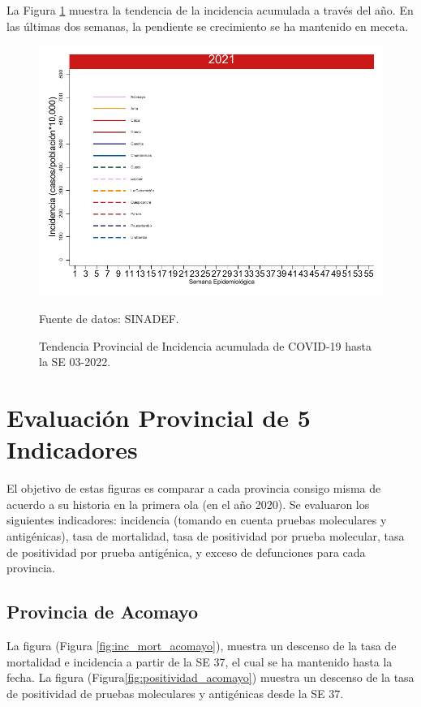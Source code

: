 \documentclass[12pt,a4paper,openany]{book}
\begin{document}
La Figura \ref{fig:incidencia_provincial} muestra la tendencia de la incidencia acumulada a través del año. En las últimas dos semanas, la pendiente se crecimiento se ha mantenido en meceta. 
%
\begin{figure}[h]
	\caption{Tendencia Provincial de Incidencia acumulada de COVID-19 hasta la SE 03-2022. }\label{fig:incidencia_provincial}
	\begin{center}
		\includegraphics[width=0.65\linewidth]{../figuras/incidencia_provincial_2021.pdf}
	\end{center}
	{\footnotesize {Fuente de datos: SINADEF.}}
\end{figure}

\clearpage
	
\section*{Evaluación Provincial de 5 Indicadores}
		\noindent El objetivo de estas figuras es comparar a cada provincia consigo misma de acuerdo a su historia  en la primera ola (en el año 2020). Se evaluaron los siguientes indicadores: incidencia (tomando en cuenta pruebas moleculares y antigénicas), tasa de mortalidad, tasa de positividad por prueba molecular, tasa de positividad por prueba antigénica, y exceso de defunciones para cada provincia.
		
		\subsection*{Provincia de Acomayo}
		\noindent La figura (Figura \ref{fig:inc_mort_acomayo}),  muestra un descenso de la tasa de mortalidad e incidencia a partir de la SE 37, el cual se ha mantenido hasta la fecha. 
		\noindent La figura (Figura\ref{fig:positividad_acomayo}) muestra un descenso de la tasa de positividad de pruebas moleculares y antigénicas desde la SE 37.
		
\end{document}
